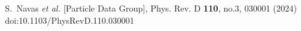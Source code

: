 S.~Navas \textit{et al.} [Particle Data Group],
Phys. Rev. D \textbf{110}, no.3, 030001 (2024)
doi:10.1103/PhysRevD.110.030001


